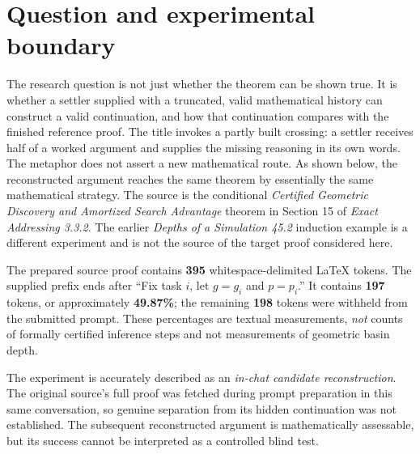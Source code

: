 \documentclass[11pt,letterpaper]{article}
\begin{document}
\section{Question and experimental boundary}
The research question is not just whether the theorem can be shown true. It is whether a
settler supplied with a truncated, valid mathematical history can construct a valid
continuation, and how that continuation compares with the finished reference proof.
The title invokes a partly built crossing: a settler receives half of a worked
argument and supplies the missing reasoning in its own words. The metaphor does
not assert a new mathematical route. As shown below, the reconstructed argument
reaches the same theorem by essentially the same mathematical strategy.
The source is the conditional \emph{Certified Geometric Discovery and Amortized Search
Advantage} theorem in Section 15 of \emph{Exact Addressing 3.3.2}. The earlier
\emph{Depths of a Simulation 45.2} induction example is a different experiment and is
not the source of the target proof considered here.

The prepared source proof contains \textbf{395} whitespace-delimited LaTeX tokens.
The supplied prefix ends after ``Fix task $i$, let $g=g_i$ and $p=p_i$.''
It contains \textbf{197} tokens, or approximately \textbf{49.87\%}; the remaining
\textbf{198} tokens were withheld from the submitted prompt. These percentages are
textual measurements, \emph{not} counts of formally certified inference steps and not
measurements of geometric basin depth.

The experiment is accurately described as an \emph{in-chat candidate reconstruction}.
The original source's full proof was fetched during prompt preparation in this same
conversation, so genuine separation from its hidden continuation was not established.
The subsequent reconstructed argument is mathematically assessable, but its success
cannot be interpreted as a controlled blind test.
\end{document}

